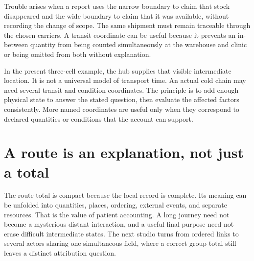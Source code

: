 Trouble arises when a report uses the narrow boundary to claim that stock disappeared and the wide boundary to claim that it was available, without recording the change of scope. The same shipment must remain traceable through the chosen carriers. A transit coordinate can be useful because it prevents an in-between quantity from being counted simultaneously at the warehouse and clinic or being omitted from both without explanation.

In the present three-cell example, the hub supplies that visible intermediate location. It is not a universal model of transport time. An actual cold chain may need several transit and condition coordinates. The principle is to add enough physical state to answer the stated question, then evaluate the affected factors consistently. More named coordinates are useful only when they correspond to declared quantities or conditions that the account can support.

\section{A route is an explanation, not just a total}

The route total is compact because the local record is complete. Its meaning can be unfolded into quantities, places, ordering, external events, and separate resources. That is the value of patient accounting. A long journey need not become a mysterious distant interaction, and a useful final purpose need not erase difficult intermediate states. The next studio turns from ordered links to several actors sharing one simultaneous field, where a correct group total still leaves a distinct attribution question.
